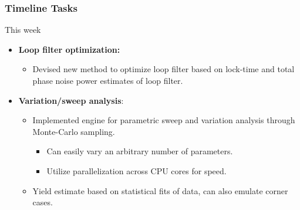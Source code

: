 \documentclass[t, screen, aspectratio=43]{beamer}
\begin{document}
\begin{frame}
	\frametitle{Timeline Tasks}
	\begin{block}{This week}
		\begin{itemize}
			\footnotesize
			\item \textbf{Loop filter optimization:}
			\begin{itemize}
				\footnotesize
				\item Devised new method to optimize loop filter based on lock-time and total phase noise power estimates of loop filter.
			\end{itemize} 
			\item \textbf{Variation/sweep analysis}:
			\begin{itemize}
				\footnotesize
				\item Implemented engine for parametric sweep and variation analysis through Monte-Carlo sampling.
				\begin{itemize}
					\scriptsize
					\item Can easily vary an arbitrary number of parameters.
					\item Utilize parallelization across CPU cores for speed.
				\end{itemize}			
				\item Yield estimate based on statistical fits of data, can also emulate corner cases. 
			\end{itemize} 
		\end{itemize}    
	\end{block}
\end{frame}

\end{document}
